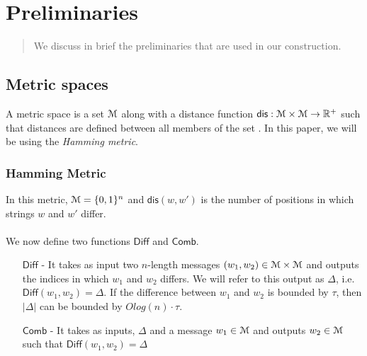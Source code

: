 \chapter{Preliminaries}
\label{chap:prelims}

\begin{quote} \small
	We discuss in brief the preliminaries that are used in our construction.
\end{quote}

\section{Metric spaces}
A metric space is a set $\mathcal{M}$ along with a distance function $\mathsf{dis}: \mathcal{M} \times \mathcal{M} \rightarrow \mathbb{R}^+$ such that distances are defined between all members of the set \cite{fuzzy}. In this paper, we will be using the \textit{Hamming metric}.
\subsection{Hamming Metric}
In this metric, $\mathcal{M} = \{0,1\}^n$ and $\mathsf{dis}(w,w')$ is the number of positions in which strings $w$ and $w'$ differ.
\\ \\
We now define two functions $\mathsf{Diff}$ and $\mathsf{Comb}$.
\begin{itemize}
	\item[$\mathsf{Diff}$] - It takes as input two $n$-length messages $(w_1, w_2) \in \mathcal{M} \times \mathcal{M}$ and outputs the indices in which $w_1$ and $w_2$ differs. We will refer to this output as $\Delta$, i.e. $\mathsf{Diff}(w_1, w_2) = \Delta$. If the difference between $w_1$ and $w_2$ is bounded by $\tau$, then $|\Delta|$ can be bounded by $O{log(n) \cdot \tau}$.
	\item[$\mathsf{Comb}$] - It takes as inputs, $\Delta$ and a message $w_1 \in \mathcal{M}$ and outputs $w_2 \in \mathcal{M}$ such that $\mathsf{Diff}(w_1, w_2) = \Delta$
\end{itemize}

